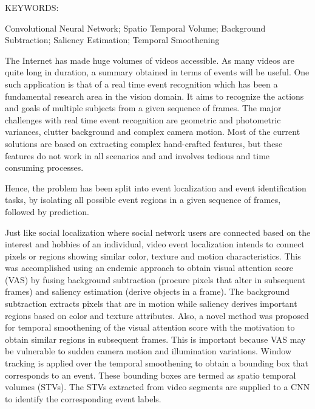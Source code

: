 \abstract

\noindent KEYWORDS: \hspace*{0.5em} \parbox[t]{4.4in}{Convolutional Neural Network; Spatio Temporal Volume; Background Subtraction; Saliency Estimation; Temporal Smoothening}

\vspace*{24pt}
The Internet has made huge volumes of videos accessible.  As many videos are quite long in duration, a summary obtained in terms of events will be useful.
One such application is that of a real time event recognition which has been a fundamental research area in the vision domain. It aims to recognize the actions and goals of multiple subjects from a given sequence of frames. The major challenges with real time event recognition are geometric and photometric variances, clutter background and complex camera motion. Most of the current solutions are based on extracting complex hand-crafted features, but these features do not work in all scenarios and and involves tedious and time consuming processes. 

\par Hence, the problem has been split into event localization and event identification tasks, by isolating all possible event regions in a given sequence of frames, followed by prediction. 

\par Just like social localization where social network users are connected based on the interest and hobbies of an individual, video event localization intends to connect pixels or regions showing similar color, texture and motion characteristics.  This was accomplished using an endemic approach to obtain visual attention score (VAS) by fusing background subtraction (procure pixels that alter in subsequent frames) and saliency estimation (derive objects in a frame). The background subtraction extracts pixels that are in motion while saliency  derives important regions based on color and texture attributes. Also, a novel method was proposed for temporal smoothening of the visual attention score  with the motivation to obtain similar regions in subsequent frames. This is important because VAS may be vulnerable to sudden camera motion and illumination variations.  Window tracking is applied over the temporal smoothening to obtain a bounding box that corresponds to an event. These bounding boxes are termed as spatio temporal volumes (STVs). The STVs extracted from video segments are supplied to a CNN to identify the corresponding event labels.

